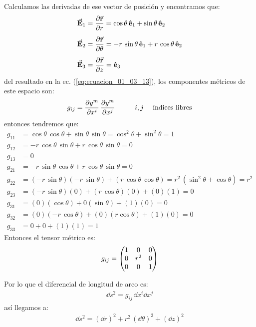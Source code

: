 \documentclass[hidelinks,12pt]{article}
\begin{document}
Calculamos las derivadas de ese vector de posición y encontramos que:
\begin{align*}
\va{E}_{1} &= \pdv{\va{r}}{r} = \cos \theta \, \vu{e}_{1} + \sin \theta \, \vu{e}_{2} \\[0.5em]
\va{E}_{2} &= \pdv{\va{r}}{\theta} = -r \, \sin \theta \, \vu{e}_{1} + r \, \cos \theta \, \vu{e}_{2} \\[0.5em]
\va{E}_{3} &= \pdv{\va{r}}{z} = \vu{e}_{3}
\end{align*}
del resultado en la ec. (\ref{eq:ecuacion_01_03_13}), los componentes métricos de este espacio son:
\begin{align*}
g_{ij} = \pdv{y^{m}}{x^{i}} \, \pdv{y^{m}}{x^{j}} \hspace{1cm} i, j \quad \mbox{ índices libres}
\end{align*}
entonces tendremos que:
\begin{align*}
g_{11} &= \cos \theta \, \cos \theta + \sin \theta \, \sin \theta = \cos^{2} \theta + \sin^{2} \theta = 1 \\[0.5em]
g_{12} &= - r \, \cos \theta \, \sin \theta + r \, \cos \theta \, \sin \theta = 0 \\[0.5em]
g_{13} &= 0 \\[0.5em]
g_{21} &= - r \, \sin \theta \, \cos \theta + r \, \cos \theta \, \sin \theta = 0 \\[0.5em] 
g_{22} &= (-r \, \sin \theta)(- r \, \sin \theta) + (r \, \cos \theta \, \cos \theta) = r^{2} \, (\sin^{2} \theta + \cos \theta) = r^{2} \\[0.5em]
g_{23} &= (- r \, \sin \theta)(0) + (r \, \cos \theta)(0) + (0)(1) = 0 \\[0.5em]
g_{31} &= (0)(\cos \theta) + 0 (\sin \theta) + (1)(0) = 0 \\[0.5em]
g_{32} &= (0)(- r \, \cos \theta) + (0)(r \cos \theta) + (1)(0) = 0 \\[0.5em]
g_{33} &= 0 + 0 + (1)(1) = 1
\end{align*}
Entonces el tensor métrico es:
\begin{align*}
g_{ij} = \mqty(
1 & 0 & 0 \\
0 & r^{2} & 0 \\
0 & 0 & 1 )
\end{align*}

Por lo que el diferencial de longitud de arco es:
\begin{align*}
\dd{s}^{2} = g_{ij} \, \dd{x}^{i} \dd{x}^{j}
\end{align*}
así llegamos a:
\begin{align*}
\dd{s}^{2} = (\dd{r})^{2} + r^{2} \, (\dd{\theta})^{2} + (\dd{z})^{2}
\end{align*}
\end{document}

